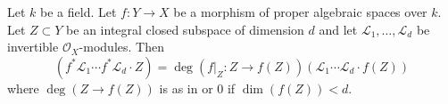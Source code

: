 \begin{lemma}
\label{lemma-intersection-number-and-pullback}
Let $k$ be a field.
Let $f : Y \to X$ be a morphism of proper algebraic spaces over $k$.
Let $Z \subset Y$ be an integral closed subspace of dimension $d$ and let
$\mathcal{L}_1, \ldots, \mathcal{L}_d$ be invertible $\mathcal{O}_X$-modules.
Then
$$
(f^*\mathcal{L}_1 \cdots f^*\mathcal{L}_d \cdot Z) =
\deg(f|_Z : Z \to f(Z)) (\mathcal{L}_1 \cdots \mathcal{L}_d \cdot f(Z))
$$
where $\deg(Z \to f(Z))$ is as in
{\it \cite[\href{http://stacks.math.columbia.edu/tag/0AD6}{Tag 0AD6}]{stacks-project}}
or $0$ if $\dim(f(Z)) < d$.
\end{lemma}

